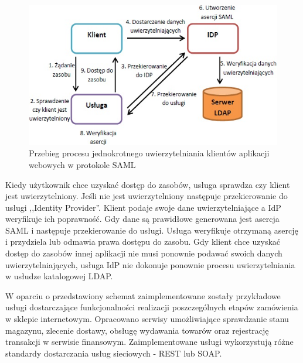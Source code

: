 	\begin{figure}[h]
		\centering
		\includegraphics{img/samlWebSSO.jpg}
		\caption{Przebieg procesu jednokrotnego uwierzytelniania klientów aplikacji webowych w protokole SAML}
		\label{samlSSOSteps}
	\end{figure}
		
	Kiedy użytkownik chce uzyskać dostęp do zasobów, usługa sprawdza czy klient jest uwierzytelniony. Jeśli nie jest uwierzytelniony następuje przekierowanie do usługi ,,Identity Provider''. Klient podaje swoje dane uwierzytelniające a IdP weryfikuje ich poprawność. Gdy dane są prawidłowe generowana jest asercja SAML i następuje przekierowanie do usługi. Usługa weryfikuje otrzymaną asercję i przydziela lub odmawia prawa dostępu do zasobu. Gdy klient chce uzyskać dostęp do zasobów innej aplikacji nie musi ponownie podawać swoich danych uwierzytelniających, usługa IdP nie dokonuje ponownie procesu uwierzytelniania w usłudze katalogowej LDAP.
	
	W oparciu o przedstawiony schemat zaimplementowane zostały przykładowe usługi dostarczające funkcjonalności realizacji poszczególnych etapów  zamówienia w sklepie internetowym. Opracowano serwisy umożliwiające sprawdzanie stanu magazynu, zlecenie dostawy, obsługę wydawania towarów oraz rejestrację transakcji w serwisie finansowym. Zaimplementowane usługi wykorzystują różne standardy dostarczania usług sieciowych - REST lub SOAP. 



